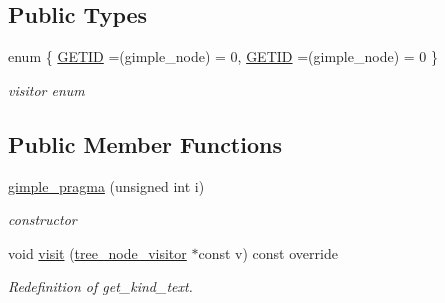 \subsection*{Public Types}
\begin{DoxyCompactItemize}
\item 
enum \{ \hyperlink{structgimple__pragma_ac09dbc27033c6fa4d012083a95408a42a6ca0d56c7d116ac535bd2d1c7c8b8224}{G\+E\+T\+ID} =(gimple\+\_\+node) = 0, 
\hyperlink{structgimple__pragma_ac09dbc27033c6fa4d012083a95408a42a6ca0d56c7d116ac535bd2d1c7c8b8224}{G\+E\+T\+ID} =(gimple\+\_\+node) = 0
 \}\begin{DoxyCompactList}\small\item\em visitor enum \end{DoxyCompactList}
\end{DoxyCompactItemize}
\subsection*{Public Member Functions}
\begin{DoxyCompactItemize}
\item 
\hyperlink{structgimple__pragma_afa39399e11e3cd76a60f188870238364}{gimple\+\_\+pragma} (unsigned int i)
\begin{DoxyCompactList}\small\item\em constructor \end{DoxyCompactList}\item 
void \hyperlink{structgimple__pragma_ac7dac0c665ea703c9d8f0891016ef972}{visit} (\hyperlink{classtree__node__visitor}{tree\+\_\+node\+\_\+visitor} $\ast$const v) const override
\begin{DoxyCompactList}\small\item\em Redefinition of get\+\_\+kind\+\_\+text. \end{DoxyCompactList}\end{DoxyCompactItemize}
